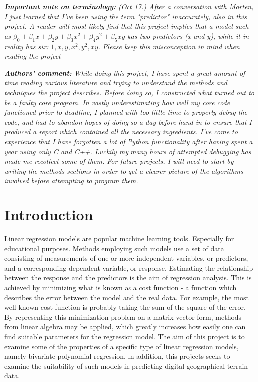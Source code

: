 \documentclass[%
oneside,                 %
final,                   %
10pt]{article}
\begin{document}
\textit{\textbf{Important note on terminology:} (Oct 17.)
 After a conversation with Morten, I just learned that I've been using the term "predictor" inaccurately, also in this project. A reader will most likely find that this project implies that a model such as $\beta_0 + \beta_1 x +\beta_2 y+ \beta_3 x^2+\beta_4 y^2+\beta_5 xy$ has two predictors (x and y), while it in reality has six: $1,x,y,x^2,y^2,xy$. Please keep this misconception in mind when reading the project} \newline


\textit{\textbf{Authors' comment:} While doing this project, I have spent a great amount of time reading various literature and trying to understand the methods and techniques the project describes. Before doing so, I constructed what turned out to be a faulty core program. In vastly underestimating how well my core code functioned prior to deadline, I planned with too little time to properly debug the code, and had to abandon hopes of doing so a day before hand in to ensure that I produced a report which contained all the necessary ingredients. I've come to experience that I have forgotten a lot of Python functionality after having spent a year using only C and C++. Luckily my many hours of attempted debugging has made me recollect some of them. For future projects, I will need to start by writing the methods sections in order to get a clearer picture of the algorithms involved before attempting to program them.}
\newpage

\section{Introduction}
Linear regression models are popular machine learning tools. Especially for educational purposes. Methods employing such models use a set of data consisting of measurements of one or more independent variables, or predictors, and a corresponding dependent variable, or response. Estimating the relationship between the response and the predictors is the aim of regression analysis. This is achieved by minimizing what is known as a cost function - a function which describes the error between the model and the real data. For example, the most well known cost function is probably taking the sum of the square of the error. By representing this minimization problem on a matrix-vector form, methods from linear algebra may be applied, which greatly increases how easily one can find suitable  parameters for the regression model.%
The aim of this project is to examine some of the properties of a specific type of linear regression models, namely bivariate polynomial regression. In addition, this projects seeks to examine the suitability of such models in predicting digital geographical terrain data.
\end{document}
